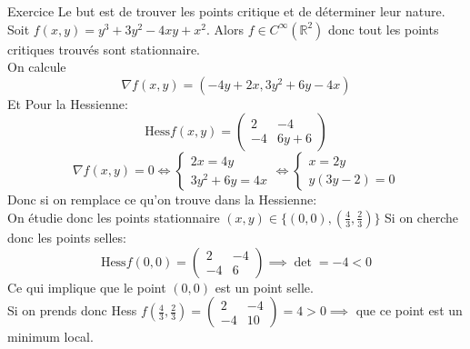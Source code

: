 \begin{parag}{Exercice}
    Le  but est de trouver les points critique et de déterminer leur nature.\\
    Soit $f\left(x, y\right) = y^3 + 3y^2 - 4xy + x^2$. Alors $f \in C^{\infty}\left(\mathbb{R}^2\right)$ donc tout les points critiques trouvés sont stationnaire.\\
    On calcule
    \begin{equation*}  
 \nabla   f\left(x, y\right) = \left(-4y + 2x, 3y^2 + 6y - 4x\right) \end{equation*}
    Et Pour la Hessienne:
    \begin{equation*} \text{Hess} f\left(x, y\right) = \begin{pmatrix} 2 & -4 \\ -4 & 6y + 6 \end{pmatrix} \end{equation*}
    \begin{equation*} \nabla f\left(x, y\right) = 0 \iff \begin{cases} 2x = 4y \\ 3y^2 + 6y = 4x \end{cases} \iff \begin{cases} x = 2y \\ y\left(3y - 2\right) = 0\end{cases} \end{equation*} 
    Donc si on remplace ce qu'on trouve dans la Hessienne:\\
    On étudie donc les points stationnaire $\left(x, y\right) \in \{\left(0, 0\right), \left( \frac{4}{3},\frac{2}{3}\right)\}$
    Si on cherche donc les points selles:
    \begin{equation*} \text{Hess} f\left(0, 0\right) = \begin{pmatrix}2 & -4 \\ -4 & 6\end{pmatrix} \implies \det = -4 < 0 \end{equation*}
    Ce qui implique que le point $\left(0, 0\right)$ est un point selle.\\
    Si on prends donc Hess $f\left(\frac{4}{3}, \frac{2}{3}\right) = \begin{pmatrix} 2 & -4 \\ -4 & 10\end{pmatrix} = 4 > 0 \implies$ que ce point est un minimum local.
   

\end{parag}



       
       



